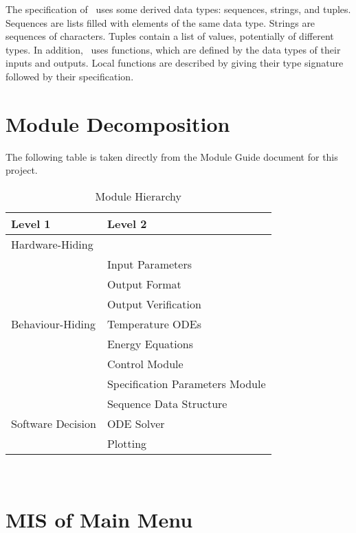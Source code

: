 \documentclass[12pt, titlepage]{article}
\begin{document}
\noindent
The specification of \progname \ uses some derived data types: sequences, strings, and
tuples. Sequences are lists filled with elements of the same data type. Strings
are sequences of characters. Tuples contain a list of values, potentially of
different types. In addition, \progname \ uses functions, which
are defined by the data types of their inputs and outputs. Local functions are
described by giving their type signature followed by their specification.

\section{Module Decomposition}

The following table is taken directly from the Module Guide document for this project.

\begin{table}[h!]
	\centering
	\begin{tabular}{p{} p{}}
		\toprule
		\textbf{Level 1} & \textbf{Level 2}\\
		\midrule
		
		{Hardware-Hiding} & ~ \\
		\midrule
		
		\multirow{7}{0.3\textwidth}{Behaviour-Hiding} & Input Parameters\\
		& Output Format\\
		& Output Verification\\
		& Temperature ODEs\\
		& Energy Equations\\ 
		& Control Module\\
		& Specification Parameters Module\\
		\midrule
		
		\multirow{3}{0.3\textwidth}{Software Decision} & {Sequence Data Structure}\\
		& ODE Solver\\
		& Plotting\\
		\bottomrule
		
	\end{tabular}
	\caption{Module Hierarchy}
	\label{TblMH}
\end{table}

\newpage
~\newpage

\section{MIS of Main Menu} \label{Module} 
\end{document}
